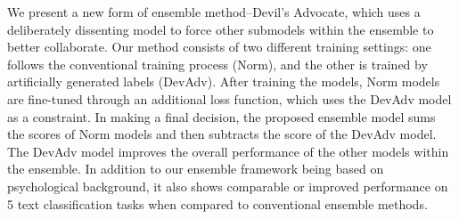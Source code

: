 We present a new form of ensemble method--Devil's Advocate, which uses a deliberately dissenting model  to force other submodels within the ensemble to better collaborate. Our method consists of two different training settings: one follows the conventional training process (Norm), and the other is trained by artificially generated labels (DevAdv). After training the models, Norm models are fine-tuned through an additional loss function, which uses the DevAdv model as a constraint. In making a final decision, the proposed ensemble model sums the scores of Norm models and then subtracts the score of the DevAdv model. The DevAdv model improves the overall performance of the other models within the ensemble. In addition to our ensemble framework being based on psychological background, it also shows comparable or improved performance on 5 text classification tasks when compared to conventional ensemble methods.
